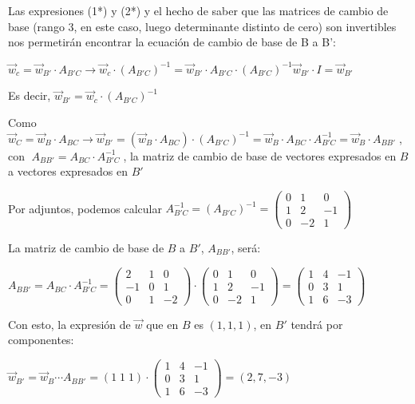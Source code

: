 \begin{proofw}
\noindent Las expresiones (1*) y (2*) y el hecho de saber que las matrices de cambio de base (rango 3, en este caso, luego determinante distinto de cero) son invertibles nos permetirán encontrar la ecuación de cambio de base de B a B':

\noindent $\vec w_c=\vec w_{B'}\cdot A_{B'C} \to  \vec w_c \cdot (A_{B'C})^{-1}=\vec w_{B'}\cdot A_{B'C} \cdot (A_{B'C})^{-1} \vec w_{B'} \cdot I=   \vec w_{B'} $

\noindent Es decir, $\vec w_{B'} = \vec w_c \cdot (A_{B'C})^{-1}$

\noindent Como $\vec w_C=\vec w_B \cdot A_{BC} \to \vec w_{B'}=(\vec w_B \cdot A_{BC} )\cdot {(A_{B'C})}^{-1}= \vec w_{B}\cdot A_{BC}\cdot A^{-1}_{B'C}=\vec w_B \cdot A_{BB'}\;$, con $\;A_{BB'}= A_{BC}\cdot A^{-1}_{B'C}\;$, la matriz de cambio de base de vectores expresados en $B$ a vectores expresados en $B'$

\noindent Por adjuntos, podemos calcular $A^{-1}_{B'C}={(A_{B'C})}^{-1}= \left( \begin{matrix} 0&1&0\\1&2&-1\\0&-2&1 \end{matrix} \right)$

\noindent La matriz de cambio de base de $B$ a $B'$, $A_{BB'}$, será:

\noindent $A_{BB'}= A_{BC}\cdot A^{-1}_{B'C}=\left( \begin{matrix} 2&1&0\\-1&0&1\\0&1&-2\end{matrix} \right) \cdot \left( \begin{matrix} 0&1&0\\1&2&-1\\0&-2&1 \end{matrix} \right) = \left( \begin{matrix} 1&4&-1\\0&3&1\\1&6&-3 \end{matrix} \right)$

\noindent Con esto, la expresión de $\vec w$ que en $B$ es $(1,1,1)$, en $B'$ tendrá por componentes:

\noindent $\vec w_{B'}=\vec w_{B} \cdots A_{BB'}= (1\; 1\; 1) \cdot \left( \begin{matrix} 1&4&-1\\0&3&1\\1&6&-3 \end{matrix} \right) = (2,7,-3)$


\end{proofw}
